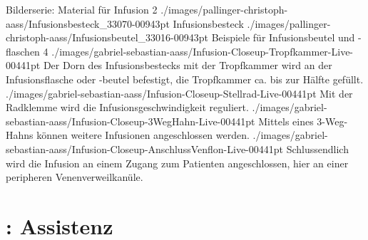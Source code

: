 \begin{PictureSeriesWide}{}{Bilderserie: Material für Infusion}
\PictureSeriesRowWide
{2}%
{./images/pallinger-christoph-aass/Infusionsbesteck_33070-00943pt}%
{Infusionsbesteck }%
{./images/pallinger-christoph-aass/Infusionsbeutel_33016-00943pt}%
{Beispiele für Infusionsbeutel und -flaschen }%
{}%
{}%
{}%
{}%
%
\PictureSeriesRowWide
{4}%
{./images/gabriel-sebastian-aass/Infusion-Closeup-Tropfkammer-Live-00441pt}%
{Der Dorn des Infusionsbestecks mit der Tropfkammer wird an der Infusionsflasche oder -beutel befestigt, die Tropfkammer ca. bis zur Hälfte gefüllt.}%
{./images/gabriel-sebastian-aass/Infusion-Closeup-Stellrad-Live-00441pt}%
{Mit der Radklemme wird die Infusionsgeschwindigkeit reguliert.}%
{./images/gabriel-sebastian-aass/Infusion-Closeup-3WegHahn-Live-00441pt}%
{Mittels eines 3-Weg-Hahns können weitere Infusionen angeschlossen werden.}%
{./images/gabriel-sebastian-aass/Infusion-Closeup-AnschlussVenflon-Live-00441pt}%
{Schlussendlich wird die Infusion an einem Zugang zum Patienten angeschlossen, hier an einer peripheren Venenverweilkanüle.}%
\end{PictureSeriesWide}

\clearpage %
\section{: Assistenz}
\label{topic:venflon}

